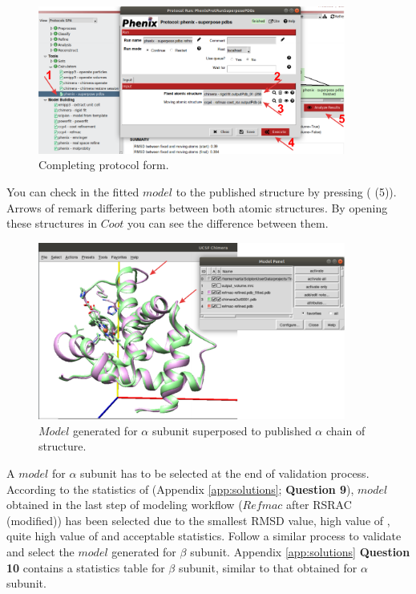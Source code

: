 \begin{itemize}
  \begin{figure}[H]
    \centering 
    \captionsetup{width=.7\linewidth} 
    \includegraphics[width=0.90\textwidth]{Images/Fig37}
    \caption{Completing \phenix {} protocol form.}
    \label{fig:superpose_pdbs_protocol}
    \end{figure}
    
  You can check in \chimera the fitted $model$ to the published structure by pressing  ( (5)). Arrows of  remark differing parts between both atomic structures. By opening these structures in $Coot$ you can see the difference between them.
 
   \begin{figure}[H]
    \centering 
    \captionsetup{width=.7\linewidth} 
    \includegraphics[width=0.90\textwidth]{Images/Fig38}
    \caption{$Model$ generated for  $\alpha$ subunit superposed to published $\alpha$ chain of  structure.}
    \label{fig:superpose_pdbs_chimera}
   \end{figure}
  
  
  \end{itemize}
 
 A $model$ for  $\alpha$ subunit has to be selected at the end of validation process. According to the statistics of  (Appendix \ref{app:solutions}; \textbf{Question 9}), $model$ obtained in the last step of modeling workflow ($Refmac$ after RSRAC (modified)) has been selected due to the smallest RMSD value, high value of \emringer {}, quite high value of \ccmask and acceptable \molprobity statistics. Follow a similar process to validate and select the $model$ generated for  $\beta$ subunit. Appendix \ref{app:solutions} \textbf{Question 10} contains a statistics table for  $\beta$ subunit, similar to that obtained for  $\alpha$ subunit.\\
 
